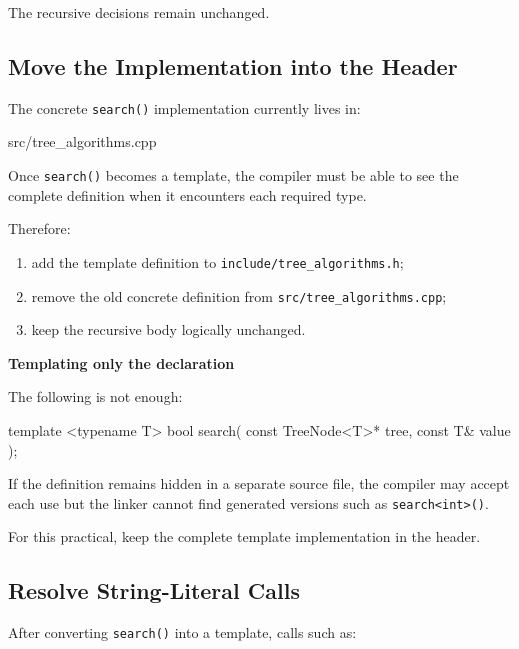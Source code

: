 \documentclass{csc2059practical}
\begin{document}
The recursive decisions remain unchanged.

\subsection{Move the Implementation into the Header}

The concrete \texttt{search()} implementation currently lives in:

\begin{terminal}
src/tree_algorithms.cpp
\end{terminal}

Once \texttt{search()} becomes a template, the compiler must be able to
see the complete definition when it encounters each required type.

Therefore:

\begin{enumerate}
    \item add the template definition to
          \texttt{include/tree_algorithms.h};
    \item remove the old concrete definition from
          \texttt{src/tree_algorithms.cpp};
    \item keep the recursive body logically unchanged.
\end{enumerate}

\begin{commonerror}
\textbf{Templating only the declaration}

The following is not enough:

\begin{cppcode}
template <typename T>
bool search(
    const TreeNode<T>* tree,
    const T& value
);
\end{cppcode}

If the definition remains hidden in a separate source file, the compiler may
accept each use but the linker cannot find generated versions such as
\texttt{search<int>()}.

For this practical, keep the complete template implementation in the header.
\end{commonerror}

\subsection{Resolve String-Literal Calls}

After converting \texttt{search()} into a template, calls such as:
\end{document}
